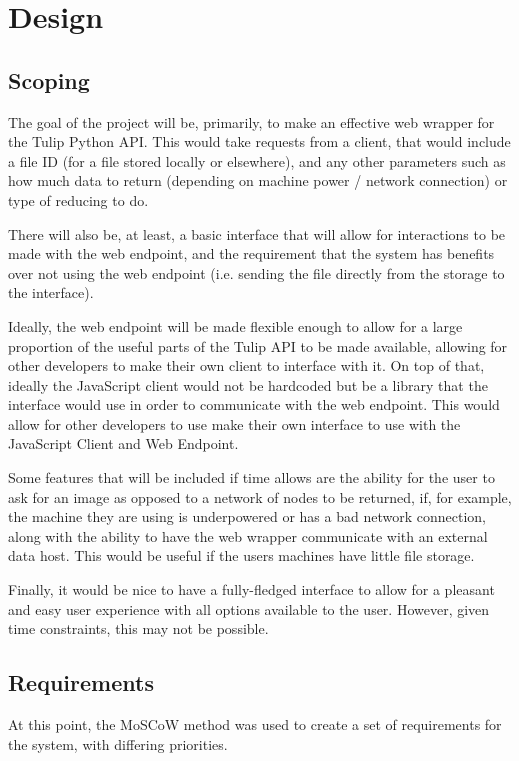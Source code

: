\documentclass[../dissertation.tex]{subfiles}
\begin{document}
\chapter{Design}

\section{Scoping}

The goal of the project will be, primarily, to make an effective web wrapper for the Tulip Python API. This would take requests from a client, that would include a file ID (for a file stored locally or elsewhere), and any other parameters such as how much data to return (depending on machine power / network connection) or type of reducing to do.

There will also be, at least, a basic interface that will allow for interactions to be made with the web endpoint, and the requirement that the system has benefits over not using the web endpoint (i.e. sending the file directly from the storage to the interface).

Ideally, the web endpoint will be made flexible enough to allow for a large proportion of the useful parts of the Tulip API to be made available, allowing for other developers to make their own client to interface with it. On top of that, ideally the JavaScript client would not be hardcoded but be a library that the interface would use in order to communicate with the web endpoint. This would allow for other developers to use make their own interface to use with the JavaScript Client and Web Endpoint.

Some features that will be included if time allows are the ability for the user to ask for an image as opposed to a network  of nodes to be returned, if, for example, the machine they are using is underpowered or has a bad network connection, along with the ability to have the web wrapper communicate with an external data host. This would be useful if the users machines have little file storage.

Finally, it would be nice to have a fully-fledged interface to allow for a pleasant and easy user experience with all options available to the user. However, given time constraints, this may not be possible.

\section{Requirements}

At this point, the MoSCoW method was used to create a set of requirements for the system, with differing priorities.
\end{document}
